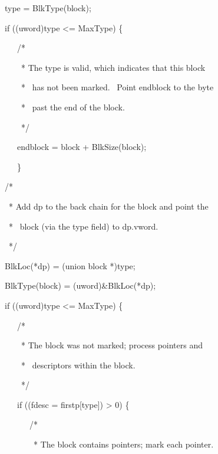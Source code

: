 {\ttfamily\mdseries
\ \ \ \ \ \ type = BlkType(block);
}

{\ttfamily\mdseries
\ \ \ \ \ \ if ((uword)type {\textless}= MaxType) \{
}


\bigskip

{\ttfamily\mdseries
\ \ \ \ \ \ \ \ \ /*
}

{\ttfamily\mdseries
\ \ \ \ \ \ \ \ \ \ * The type is valid, which indicates that this block}

{\ttfamily\mdseries
\ \ \ \ \ \ \ \ \ \ * \ has not been marked. \ Point endblock to the byte}

{\ttfamily\mdseries
\ \ \ \ \ \ \ \ \ \ * \ past the end of the block.
}

{\ttfamily\mdseries
\ \ \ \ \ \ \ \ \ \ */
}

{\ttfamily\mdseries
\ \ \ \ \ \ \ \ \ endblock = block + BlkSize(block);
}

{\ttfamily\mdseries
\ \ \ \ \ \ \ \ \ \}
}


\bigskip

{\ttfamily\mdseries
\ \ \ \ \ \ /*
}

{\ttfamily\mdseries
\ \ \ \ \ \ \ * Add dp to the back chain for the block and point the
}

{\ttfamily\mdseries
\ \ \ \ \ \ \ * \ block (via the type field) to dp.vword.
}

{\ttfamily\mdseries
\ \ \ \ \ \ \ */
}

{\ttfamily\mdseries
\ \ \ \ \ \ BlkLoc(*dp) = (union block *)type;
}

{\ttfamily\mdseries
\ \ \ \ \ \ BlkType(block) = (uword)\&BlkLoc(*dp);}

\bigskip

{\ttfamily\mdseries
\ \ \ \ \ \ if ((uword)type {\textless}= MaxType) \{
}

{\ttfamily\mdseries
\ \ \ \ \ \ \ \ \ /*
}

{\ttfamily\mdseries
\ \ \ \ \ \ \ \ \ \ * The block was not marked; process pointers and
}

{\ttfamily\mdseries
\ \ \ \ \ \ \ \ \ \ * \ descriptors within the block.
}

{\ttfamily\mdseries
\ \ \ \ \ \ \ \ \ \ */
}

{\ttfamily\mdseries
\ \ \ \ \ \ \ \ \ if ((fdesc = firstp[type]) {\textgreater} 0) \{
}

{\ttfamily\mdseries
\ \ \ \ \ \ \ \ \ \ \ \ /*
}

{\ttfamily\mdseries
\ \ \ \ \ \ \ \ \ \ \ \ \ * The block contains pointers; mark each pointer.
}

